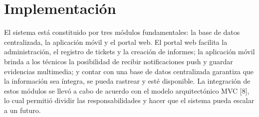 \section{Implementación}
El sistema está constituido por tres módulos fundamentales: la base de datos 
centralizada, la aplicación móvil y el portal web. El portal web facilita la administración, 
el registro de tickets y la creación de informes; la aplicación móvil brinda a los técnicos 
la posibilidad de recibir notificaciones push y guardar evidencias multimedia; y contar 
con una base de datos centralizada garantiza que la información sea íntegra, se pueda 
rastrear y esté disponible. La integración de estos módulos se llevó a cabo de acuerdo 
con el modelo arquitectónico MVC [8], lo cual permitió dividir las responsabilidades y 
hacer que el sistema pueda escalar a un futuro. 